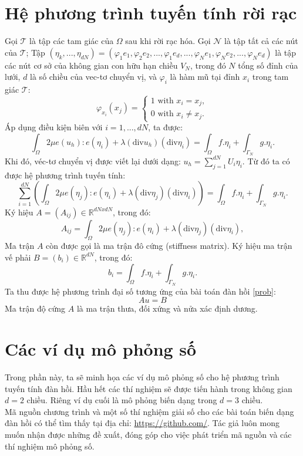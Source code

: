 \section{Hệ phương trình tuyến tính rời rạc}\label{sec:chap1_linearSystem}
Gọi $\mathcal{T}$ là tập các tam giác của $\Omega$ sau khi rời rạc hóa. Gọi $\mathcal{N}$ là tập tất cả các nút của $\mathcal{T}$; Tập $(\eta_k,...,\eta_{dN})=(\varphi_1e_1, \varphi_2e_2,...,\varphi_1e_d,...,\varphi_Ne_1,\varphi_Ne_2,...,\varphi_Ne_d)$ là tập các nút cơ sở của không gian con hữu hạn chiều $V_N$, trong đó $N$ tổng số đỉnh của lưới, $d$ là số chiều của vec-tơ chuyển vị, và $\varphi_i$ là hàm mũ tại đỉnh $x_i$ trong tam giác $\mathcal{T}$:
$$\varphi_{x_i}(x_j) = \begin{cases}
1 \text{ with } x_i = x_j, \\
0 \text{ with } x_i \neq x_j.
\end{cases}$$
Áp dụng điều kiện biên với $i = 1,...,dN$, ta được:
$$\int_\Omega 2\mu e(u_h) : e(\eta_i) + \lambda(\text{div}u_h)(\text{div}\eta_i) = \int_\Omega f.\eta_i + \int_{\Gamma_N}g.\eta_i.$$
Khi đó, véc-tơ chuyển vị được viết lại dưới dạng: $u_h = \sum_{j=1}^{dN}U_i\eta_i$. Từ đó ta có được hệ phương trình tuyến tính:
$$\displaystyle\sum^{dN}_{i=1}(\displaystyle\int_\Omega 2\mu e(\eta_j) : e(\eta_i) + \lambda(\text{div}\eta_j)(\text{div}\eta_i)) = \int_\Omega f.\eta_i + \int_{\Gamma_N}g.\eta_i.$$
Ký hiệu $A=(A_{ij})\in\mathbb{R}^{dN x dN}$, trong đó:
$$A_{ij}=\displaystyle\int_\Omega 2\mu e(\eta_j) : e(\eta_i) + \lambda(\text{div}\eta_j)(\text{div}\eta_i),$$
Ma trận $A$ còn được gọi là ma trận đô cứng (stiffness matrix).
Ký hiệu ma trận vế phải $B=(b_i)\in\mathbb{R}^{dN}$, trong đó:
$$b_i=\int_\Omega f.\eta_i + \int_{\Gamma_N}g.\eta_i.$$
Ta thu được hệ phương trình đại số tương ứng của bài toán đàn hồi \eqref{prob}:
\begin{equation}\label{pron}
Au=B
\end{equation}
Ma trận độ cứng $A$ là ma trận thưa, đối xứng và nửa xác định dương.
\section{Các ví dụ mô phỏng số}
Trong phần này, ta sẽ minh họa các ví dụ mô phỏng số cho hệ phương trình tuyến tính đàn hồi. Hầu hết các thí nghiệm sẽ được tiến hành trong không gian $d=2$ chiều. Riêng ví dụ cuối là mô phỏng biến dạng trong $d=3$ chiều.\\
Mã nguồn chương trình và một số thí nghiệm giải số cho các bài toán biến dạng đàn hồi có thể tìm thấy tại địa chỉ: \url{https://github.com/}. Tác giả luôn mong muốn nhận được những đề xuất, đóng góp cho việc phát triển mã nguồn và các thí nghiệm mô phỏng số.
